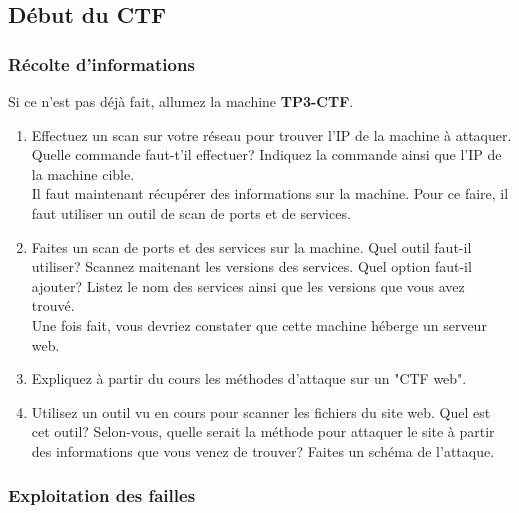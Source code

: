 \subsection{Début du CTF}
\label{chap:Mini Projet}

\subsubsection{Récolte d'informations}
Si ce n'est pas déjà fait, allumez la machine \textbf{TP3-CTF}.

\begin{enumerate}
    \item Effectuez un scan sur votre réseau pour trouver l'IP de la machine à attaquer.\\
        Quelle commande faut-t'il effectuer? Indiquez la commande ainsi que l'IP de la machine cible.\\
        
    Il faut maintenant récupérer des informations sur la machine. Pour ce faire, il faut utiliser un outil de scan de ports et de services.\\
    
    \item Faites un scan de ports et des services sur la machine. Quel outil faut-il utiliser? Scannez maitenant les versions des services. Quel option faut-il ajouter? Listez le nom des services ainsi que les versions que vous avez trouvé.\\
    
    Une fois fait, vous devriez constater que cette machine héberge un serveur web.\\
    
    \item Expliquez à partir du cours les méthodes d'attaque sur un "CTF web". \\
    
    \item Utilisez un outil vu en cours pour scanner les fichiers du site web. Quel est cet outil? Selon-vous, quelle serait la méthode pour attaquer le site à partir des informations que vous venez de trouver? Faites un schéma de l'attaque.
\end{enumerate}

\subsubsection{Exploitation des failles}

